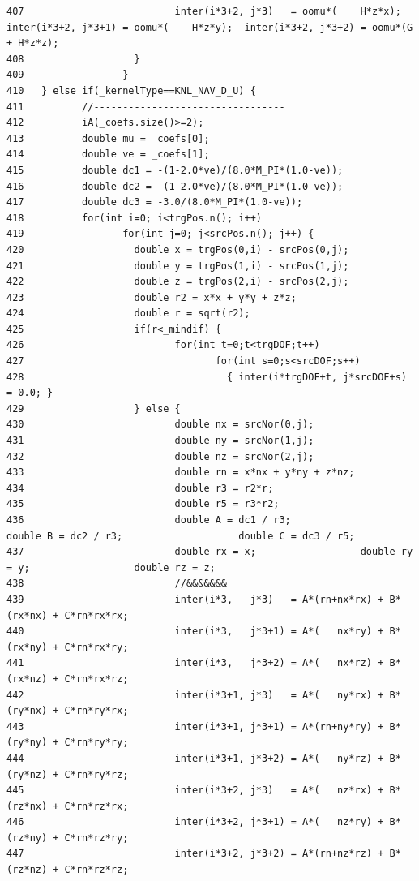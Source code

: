 \begin{verbatim}
407                          inter(i*3+2, j*3)   = oomu*(    H*z*x);  inter(i*3+2, j*3+1) = oomu*(    H*z*y);  inter(i*3+2, j*3+2) = oomu*(G + H*z*z);
408                   }
409                 }
410   } else if(_kernelType==KNL_NAV_D_U) {
411          //---------------------------------
412          iA(_coefs.size()>=2);
413          double mu = _coefs[0];
414          double ve = _coefs[1];
415          double dc1 = -(1-2.0*ve)/(8.0*M_PI*(1.0-ve));
416          double dc2 =  (1-2.0*ve)/(8.0*M_PI*(1.0-ve));
417          double dc3 = -3.0/(8.0*M_PI*(1.0-ve));
418          for(int i=0; i<trgPos.n(); i++)
419                 for(int j=0; j<srcPos.n(); j++) {
420                   double x = trgPos(0,i) - srcPos(0,j);
421                   double y = trgPos(1,i) - srcPos(1,j);
422                   double z = trgPos(2,i) - srcPos(2,j);
423                   double r2 = x*x + y*y + z*z;
424                   double r = sqrt(r2);
425                   if(r<_mindif) {
426                          for(int t=0;t<trgDOF;t++)
427                                 for(int s=0;s<srcDOF;s++)
428                                   { inter(i*trgDOF+t, j*srcDOF+s) = 0.0; }
429                   } else {
430                          double nx = srcNor(0,j);
431                          double ny = srcNor(1,j);
432                          double nz = srcNor(2,j);
433                          double rn = x*nx + y*ny + z*nz;
434                          double r3 = r2*r;
435                          double r5 = r3*r2;
436                          double A = dc1 / r3;                    double B = dc2 / r3;                    double C = dc3 / r5;
437                          double rx = x;                  double ry = y;                  double rz = z;
438                          //&&&&&&&
439                          inter(i*3,   j*3)   = A*(rn+nx*rx) + B*(rx*nx) + C*rn*rx*rx;
440                          inter(i*3,   j*3+1) = A*(   nx*ry) + B*(rx*ny) + C*rn*rx*ry;
441                          inter(i*3,   j*3+2) = A*(   nx*rz) + B*(rx*nz) + C*rn*rx*rz;
442                          inter(i*3+1, j*3)   = A*(   ny*rx) + B*(ry*nx) + C*rn*ry*rx;
443                          inter(i*3+1, j*3+1) = A*(rn+ny*ry) + B*(ry*ny) + C*rn*ry*ry;
444                          inter(i*3+1, j*3+2) = A*(   ny*rz) + B*(ry*nz) + C*rn*ry*rz;
445                          inter(i*3+2, j*3)   = A*(   nz*rx) + B*(rz*nx) + C*rn*rz*rx;
446                          inter(i*3+2, j*3+1) = A*(   nz*ry) + B*(rz*ny) + C*rn*rz*ry;
447                          inter(i*3+2, j*3+2) = A*(rn+nz*rz) + B*(rz*nz) + C*rn*rz*rz;

\end{verbatim}
